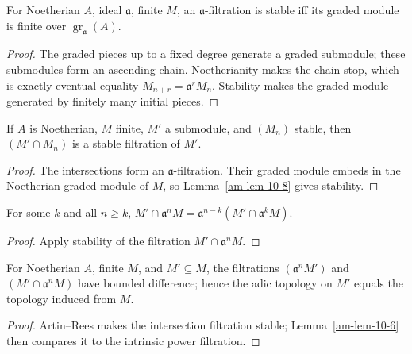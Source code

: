 \begin{lemma}
\label{am-lem-10-8}
\uses{}
For Noetherian $A$, ideal $\mathfrak{a}$, finite $M$, an $\mathfrak{a}$-filtration is stable
iff its graded module is finite over $\operatorname{gr}_{\mathfrak{a}}(A)$.
\end{lemma}
\begin{proof}
The graded pieces up to a fixed degree generate a graded submodule; these
submodules form an ascending chain.  Noetherianity makes the chain stop, which
is exactly eventual equality $M_{n+r}=\mathfrak{a}^rM_n$.  Stability makes the
graded module generated by finitely many initial pieces.
\end{proof}
\begin{proposition}
\label{am-prop-10-9}
\uses{}
If $A$ is Noetherian, $M$ finite, $M'$ a submodule, and $(M_n)$ stable, then
$(M'\cap M_n)$ is a stable filtration of $M'$.
\end{proposition}
\begin{proof}
The intersections form an $\mathfrak{a}$-filtration.  Their graded module embeds
in the Noetherian graded module of $M$, so Lemma~\ref{am-lem-10-8} gives
stability.
\end{proof}
\begin{corollary}
\label{am-cor-10-10}
\uses{}
For some $k$ and all $n\ge k$,
$M'\cap\mathfrak{a}^nM=\mathfrak{a}^{n-k}(M'\cap\mathfrak{a}^kM)$.
\end{corollary}
\begin{proof}
Apply stability of the filtration $M'\cap\mathfrak{a}^nM$.
\end{proof}
\begin{theorem}
\label{am-thm-10-11}
\uses{}
For Noetherian $A$, finite $M$, and $M'\subseteq M$, the filtrations
$(\mathfrak{a}^nM')$ and $(M'\cap\mathfrak{a}^nM)$ have bounded difference; hence the
adic topology on $M'$ equals the topology induced from $M$.
\end{theorem}
\begin{proof}
Artin--Rees makes the intersection filtration stable; Lemma~\ref{am-lem-10-6}
then compares it to the intrinsic power filtration.
\end{proof}

